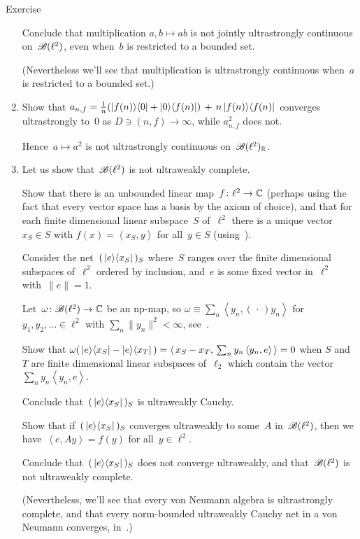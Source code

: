 \documentclass[a]{subfiles}
\begin{document}
\begin{parsec}
\begin{point}[vn-counterexamples]{Exercise}
\begin{enumerate}
Conclude that multiplication $a,b\mapsto ab$
is not jointly ultrastrongly continuous on~$\mathscr{B}(\ell^2)$,
even when~$b$ is restricted to a bounded set.

(Nevertheless we'll see that multiplication is ultrastrongly continuous
when~$a$ is restricted to a bounded set.)

\item
Show that
$a_{n,f} = \frac{1}{n}(\left|f(n)\right>\!\left<0\right|+\left|0\right>\!\left<f(n)\right|)
\,+\, n\left|f(n)\right>\!\left<f(n)\right|$
converges ultrastrongly to~$0$
as $D\ni(n,f)\to\infty$,
while $a_{n,f}^2$ does not.

Hence~$a\mapsto a^2$ is not ultrastrongly continuous on~$\mathscr{B}(\ell^2)_{\mathbb{R}}$.

\item
Let us show that~$\mathscr{B}(\ell^2)$
is not ultraweakly complete.

Show that there is an unbounded linear map~$f\colon \ell^2\to\mathbb{C}$
(perhaps using the fact that every vector space
has a basis by the axiom of choice),
and that for each finite dimensional linear subspace~$S$ of~$\ell^2$
there is a unique vector~$x_S\in S$ 
with
$f(x)=\left<x_S,y\right>$ for all~$y\in S$
(using~).

Consider the net~$(\,\left|e\right>\!\left<x_S\right|\,)_S$
where~$S$ ranges over the finite dimensional subspaces of~$\ell^2$
ordered by inclusion,
and~$e$ is some fixed vector in~$\ell^2$ with~$\|e\|=1$.

Let~$\omega\colon \mathscr{B}(\ell^2)\to\mathbb{C}$
be an np-map,
so $\omega\equiv \sum_n \left<y_n,(\,\cdot\,)y_n\right>$
for $y_1,y_2,\dotsc \in \ell^2$ with $\sum_n \|y_n\|^2 <\infty$,
see~.

Show that $\omega(\,\left|e\right>\!\left<x_S\right|-\left|e\right>\!\left<x_T\right|\,)
= \left<\,x_S-x_T,\,\sum_n y_n\left<y_n,e\right>\,\right> = 0$
when $S$ and~$T$ are finite dimensional linear subspaces of~$\ell_2$
which contain the vector $\sum_n y_n\left<y_n,e\right>$.

Conclude that~$(\,\left|e\right>\!\left<x_S\right|\,)_S$
is ultraweakly Cauchy.

Show that if~$(\,\left|e\right>\!\left<x_S\right|\,)_S$
converges ultraweakly to some~$A$ in~$\mathscr{B}(\ell^2)$,
then we have~$\left<e,Ay\right>=f(y)$
for all~$y\in\ell^2$.

Conclude that~$(\,\left|e\right>\!\left<x_S\right|\,)_S$
does not converge ultraweakly,
and that~$\mathscr{B}(\ell^2)$ is not ultraweakly complete.

(Nevertheless, we'll see that every von Neumann algebra
is ultrastrongly complete, and that
every norm-bounded ultraweakly Cauchy net
in a von Neumann converges, in~.)
\end{enumerate}
\end{point}
\end{parsec}
\end{document}
